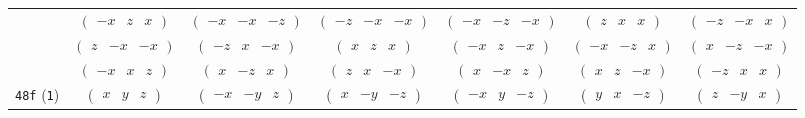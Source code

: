 \documentclass[fleqn,9pt,landscape]{jsarticle}
\begin{document}
\begin{center}
\begin{longtable}{ccccccc}
& $ \begin{pmatrix} - x & z & x \end{pmatrix} $ & $ \begin{pmatrix} - x & - x & - z \end{pmatrix} $ & $ \begin{pmatrix} - z & - x & - x \end{pmatrix} $ & $ \begin{pmatrix} - x & - z & - x \end{pmatrix} $ & $ \begin{pmatrix} z & x & x \end{pmatrix} $ & $ \begin{pmatrix} - z & - x & x \end{pmatrix} $ \\
& $ \begin{pmatrix} z & - x & - x \end{pmatrix} $ & $ \begin{pmatrix} - z & x & - x \end{pmatrix} $ & $ \begin{pmatrix} x & z & x \end{pmatrix} $ & $ \begin{pmatrix} - x & z & - x \end{pmatrix} $ & $ \begin{pmatrix} - x & - z & x \end{pmatrix} $ & $ \begin{pmatrix} x & - z & - x \end{pmatrix} $ \\
& $ \begin{pmatrix} - x & x & z \end{pmatrix} $ & $ \begin{pmatrix} x & - z & x \end{pmatrix} $ & $ \begin{pmatrix} z & x & - x \end{pmatrix} $ & $ \begin{pmatrix} x & - x & z \end{pmatrix} $ & $ \begin{pmatrix} x & z & - x \end{pmatrix} $ & $ \begin{pmatrix} - z & x & x \end{pmatrix} $ \\ \hline
{\tt 48f} ({\tt 1}) & $ \begin{pmatrix} x & y & z \end{pmatrix} $ & $ \begin{pmatrix} - x & - y & z \end{pmatrix} $ & $ \begin{pmatrix} x & - y & - z \end{pmatrix} $ & $ \begin{pmatrix} - x & y & - z \end{pmatrix} $ & $ \begin{pmatrix} y & x & - z \end{pmatrix} $ & $ \begin{pmatrix} z & - y & x \end{pmatrix} $ \\

\end{longtable}
\end{center}
\end{document}
